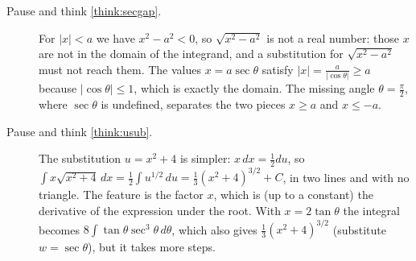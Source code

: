 \documentclass[11pt]{article}
\begin{document}
\begin{description}
  \item[Pause and think \ref{think:secgap}.] For $\lvert x\rvert<a$ we have $x^2-a^2<0$, so $\sqrt{x^2-a^2}$ is not a real number: those $x$ are not in the domain of the integrand, and a substitution for $\sqrt{x^2-a^2}$ must not reach them. The values $x=a\sec\theta$ satisfy $\lvert x\rvert=\frac a{\lvert\cos\theta\rvert}\ge a$ because $\lvert\cos\theta\rvert\le1$, which is exactly the domain. The missing angle $\theta=\frac\pi2$, where $\sec\theta$ is undefined, separates the two pieces $x\ge a$ and $x\le-a$.

  \item[Pause and think \ref{think:usub}.] The substitution $u=x^2+4$ is simpler: $x\,dx=\frac12du$, so $\int x\sqrt{x^2+4}\,dx=\frac12\int u^{1/2}\,du=\frac13(x^2+4)^{3/2}+C$, in two lines and with no triangle. The feature is the factor $x$, which is (up to a constant) the derivative of the expression under the root. With $x=2\tan\theta$ the integral becomes $8\int\tan\theta\sec^3\theta\,d\theta$, which also gives $\frac13(x^2+4)^{3/2}$ (substitute $w=\sec\theta$), but it takes more steps.
\end{description}
\end{document}
